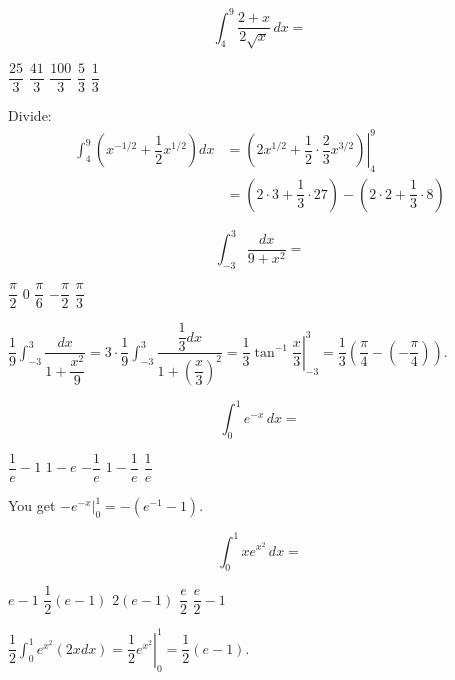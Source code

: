 \question
\[
\int_{4}^{9} \dfrac{2+x}{2 \sqrt{x}}\,dx=
\]
\begin{choices}
  \CorrectChoice $\dfrac{25}{3}$
  \choice $\dfrac{41}{3}$
  \choice $\dfrac{100}{3}$
  \choice $\dfrac{5}{3}$
  \choice $\dfrac{1}{3}$
\end{choices}
\begin{solution}
Divide:
\[
\begin{aligned}
\int_{4}^{9}\left(x^{-1 / 2}+\dfrac{1}{2} x^{1 / 2}\right) d x & =\left.\left(2 x^{1 / 2}+\dfrac{1}{2} \cdot \dfrac{2}{3} x^{3 / 2}\right)\right|_{4} ^{9} \\
& =\left(2 \cdot 3+\dfrac{1}{3} \cdot 27\right)-\left(2 \cdot 2+\dfrac{1}{3} \cdot 8\right)
\end{aligned}
\]
\end{solution}




\newpage




\question
\[
\int_{-3}^{3} \dfrac{d x}{9+x^{2}}=
\]
\begin{choices}
  \choice $\dfrac{\pi}{2}$
  \choice $0$
  \CorrectChoice $\dfrac{\pi}{6}$
  \choice $-\dfrac{\pi}{2}$
  \choice $\dfrac{\pi}{3}$
\end{choices}
\begin{solution}
$\dfrac{1}{9} \int_{-3}^{3} \dfrac{d x}{1+\dfrac{x^{2}}{9}}=3 \cdot \dfrac{1}{9} \int_{-3}^{3} \dfrac{\dfrac{1}{3} d x}{1+\left(\dfrac{x}{3}\right)^{2}}=\left.\dfrac{1}{3} \tan ^{-1} \dfrac{x}{3}\right|_{-3} ^{3}=\dfrac{1}{3}\left(\dfrac{\pi}{4}-\left(-\dfrac{\pi}{4}\right)\right)$.
\end{solution}

\question
\[
\int_{0}^{1} e^{-x}\,dx=
\]
\begin{choices}
  \choice $\dfrac{1}{e}-1$
  \choice $1-e$
  \choice $-\dfrac{1}{e}$
  \CorrectChoice $1-\dfrac{1}{e}$
  \choice $\dfrac{1}{e}$
\end{choices}
\begin{solution}
You get $-\left.e^{-x}\right|_{0} ^{1}=-\left(e^{-1}-1\right)$.
\end{solution}

\question
\[
\int_{0}^{1} x e^{x^{2}}\,dx=
\]
\begin{choices}
  \choice $e-1$
  \CorrectChoice $\dfrac{1}{2}(e-1)$
  \choice $2(e-1)$
  \choice $\dfrac{e}{2}$
  \choice $\dfrac{e}{2}-1$
\end{choices}
\begin{solution}
$\dfrac{1}{2} \int_{0}^{1} e^{x^{2}}(2 x d x)=\left.\dfrac{1}{2} e^{x^{2}}\right|_{0} ^{1}=\dfrac{1}{2}(e-1)$.
\end{solution}




